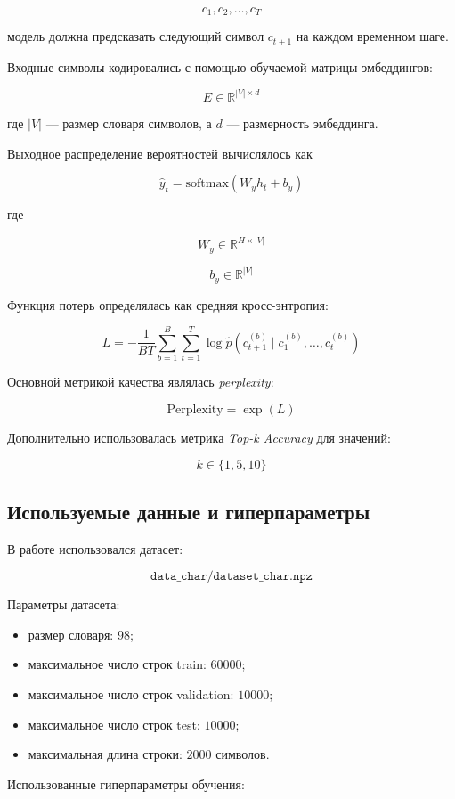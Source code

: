 \[
c_1, c_2, \dots, c_T
\]

модель должна предсказать следующий символ $c_{t+1}$ на каждом временном шаге.

Входные символы кодировались с помощью обучаемой матрицы эмбеддингов:

\[
E \in \mathbb{R}^{|V| \times d}
\]

где $|V|$ --- размер словаря символов, а $d$ --- размерность эмбеддинга.

Выходное распределение вероятностей вычислялось как

\[
\hat{y}_t =
\text{softmax}(W_y h_t + b_y)
\]

где

\[
W_y \in \mathbb{R}^{H \times |V|}
\]

\[
b_y \in \mathbb{R}^{|V|}
\]

Функция потерь определялась как средняя кросс-энтропия:

\[
L
=
-
\frac{1}{BT}
\sum_{b=1}^{B}
\sum_{t=1}^{T}
\log
\hat{p}
(c_{t+1}^{(b)}
\mid
c_1^{(b)},\dots,c_t^{(b)})
\]

Основной метрикой качества являлась \textit{perplexity}:

\[
\text{Perplexity}
=
\exp(L)
\]

Дополнительно использовалась метрика \textit{Top-k Accuracy} для значений:

\[
k \in \{1,5,10\}
\]

\subsection{Используемые данные и гиперпараметры}

В работе использовался датасет:

\[
\texttt{data\_char/dataset\_char.npz}
\]

Параметры датасета:

\begin{itemize}
    \item размер словаря: $98$;
    \item максимальное число строк train: $60000$;
    \item максимальное число строк validation: $10000$;
    \item максимальное число строк test: $10000$;
    \item максимальная длина строки: $2000$ символов.
\end{itemize}

Использованные гиперпараметры обучения:

